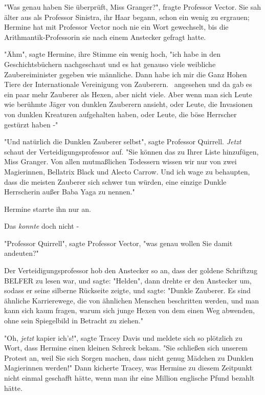 {"Was genau haben Sie überprüft, Miss Granger?", fragte Professor Vector. Sie sah älter aus als Professor Sinistra, ihr Haar begann, schon ein wenig zu ergrauen; Hermine hat mit Professor Vector noch nie ein Wort gewechselt, bis die Arithmantik-Professorin sie nach einem Anstecker gefragt hatte.

"Ähm", sagte Hermine, ihre Stimme ein wenig hoch, "ich habe in den Geschichtsbüchern nachgeschaut und es hat genauso viele weibliche Zaubereiminister gegeben wie männliche. Dann habe ich mir die Ganz Hohen Tiere der Internationale Vereinigung von Zauberern. ~angesehen und da gab es ein paar mehr Zauberer als Hexen, aber nicht viele. Aber wenn man sich Leute wie berühmte Jäger von dunklen Zauberern ansieht, oder Leute, die Invasionen von dunklen Kreaturen aufgehalten haben, oder Leute, die böse Herrscher gestürzt haben -"

"Und natürlich die Dunklen Zauberer selbst", sagte Professor Quirrell. \emph{Jetzt} schaut der Verteidigungsprofessor auf. "Sie können das zu Ihrer Liste hinzufügen, Miss Granger. Von allen mutmaßlichen Todessern wissen wir nur von zwei Magierinnen, Bellatrix Black und Alecto Carrow. Und ich wage zu behaupten, dass die meisten Zauberer sich schwer tun würden, eine einzige Dunkle Herrscherin außer Baba Yaga zu nennen."

Hermine starrte ihn nur an.

Das \emph{konnte} doch nicht -

"Professor Quirrell", sagte Professor Vector, "was genau wollen Sie damit andeuten?"

Der Verteidigungsprofessor hob den Anstecker so an, dass der goldene Schriftzug BELFER zu lesen war, und sagte: "Helden", dann drehte er den Anstecker um, sodass er seine silberne Rückseite zeigte, und sagte: "Dunkle Zauberer. Es sind ähnliche Karrierewege, die von ähnlichen Menschen beschritten werden, und man kann sich kaum fragen, warum sich junge Hexen von dem einen Weg abwenden, ohne sein Spiegelbild in Betracht zu ziehen."

"Oh, \emph{jetzt} kapier ich's!", sagte Tracey Davis und meldete sich so plötzlich zu Wort, dass Hermine einen kleinen Schreck bekam. "Sie schließen sich unserem Protest an, weil Sie sich Sorgen machen, dass nicht genug Mädchen zu Dunklen Magierinnen werden!" Dann kicherte Tracey, was Hermine zu diesem Zeitpunkt nicht einmal geschafft hätte, wenn man ihr eine Million englische Pfund bezahlt hätte.

}
